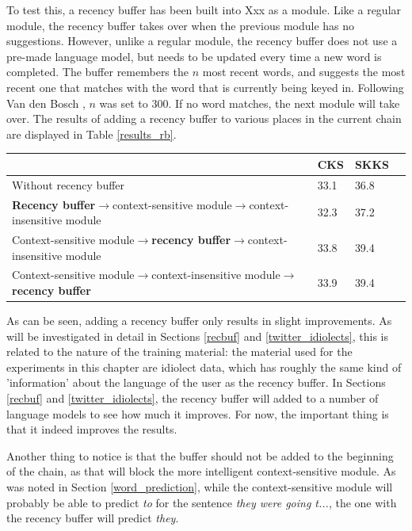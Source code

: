 \documentclass[11pt]{article}
\let\originaltable\table
\let\endoriginaltable\endtable
\renewenvironment{table}[1][ht]{%
  \originaltable[#1]
  \centering}%
  {\endoriginaltable}
\begin{document}
To test this, a recency buffer has been built into Xxx as a module. Like a regular module, the recency buffer takes over when the previous module has no suggestions. However, unlike a regular module, the recency buffer does not use a pre-made language model, but needs to be updated every time a new word is completed. The buffer remembers the $n$ most recent words, and suggests the most recent one that matches with the word that is currently being keyed in. Following Van den Bosch , $n$ was set to 300. If no word matches, the next module will take over. The results of adding a recency buffer to various places in the current chain are displayed in Table \ref{results_rb}.

\begin{table}[h]
\begin{tabular}{l|lll} 

&CKS&SKKS\\
\hline
Without recency buffer&33.1&36.8\\
\textbf{Recency buffer}$\rightarrow$context-sensitive module$\rightarrow$context-insensitive module&32.3&37.2\\
Context-sensitive module$\rightarrow$\textbf{recency buffer}$\rightarrow$context-insensitive module&33.8&39.4\\
Context-sensitive module$\rightarrow$context-insensitive module$\rightarrow$\textbf{recency buffer}&33.9&39.4\\
\end{tabular} 
\caption{Percentage of keystrokes saved with and without a recency buffer.} \label{results_rb}
\end{table}

As can be seen, adding a recency buffer only results in slight improvements. As will be investigated in detail in Sections \ref{recbuf} and \ref{twitter_idiolects}, this is related to the nature of the training material: the material used for the experiments in this chapter are idiolect data, which has roughly the same kind of 'information' about the language of the user as the recency buffer. In Sections \ref{recbuf} and \ref{twitter_idiolects}, the recency buffer will added to a number of language models to see how much it improves. For now, the important thing is that it indeed improves the results. 

Another thing to notice is that the buffer should not be added to the beginning of the chain, as that will block the more intelligent context-sensitive module. As was noted in Section \ref{word_prediction}, while the context-sensitive module will probably be able to predict \emph{to} for the sentence \emph{they were going t...}, the one with the recency buffer will predict \emph{they}.
\end{document}
